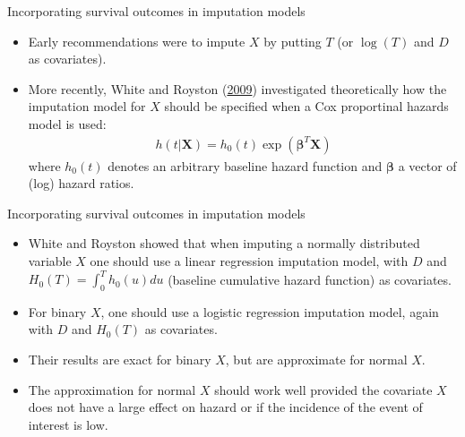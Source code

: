 \documentclass[ignorenonframetext,]{beamer}
\providecommand{\tightlist}{%
  \setlength{\itemsep}{0pt}\setlength{\parskip}{0pt}}
\begin{document}
\begin{frame}{Incorporating survival outcomes in imputation models}
\protect\hypertarget{incorporating-survival-outcomes-in-imputation-models}{}

\begin{itemize}
\tightlist
\item
  Early recommendations were to impute \(X\) by putting \(T\) (or
  \(\log(T)\) and \(D\) as covariates).
\item
  More recently, White and Royston
  (\protect\hyperlink{ref-White2009}{2009}) investigated theoretically
  how the imputation model for \(X\) should be specified when a Cox
  proportinal hazards model is used:\\
  \begin{align}
    h(t|\mathbf X) = h_{0}(t) \exp(\boldsymbol \beta^{T} \mathbf X)
  \end{align} where \(h_{0}(t)\) denotes an arbitrary baseline hazard
  function and \(\boldsymbol \beta\) a vector of (log) hazard ratios.
\end{itemize}

\end{frame}

\begin{frame}{Incorporating survival outcomes in imputation models}
\protect\hypertarget{incorporating-survival-outcomes-in-imputation-models-1}{}

\begin{itemize}
\tightlist
\item
  White and Royston showed that when imputing a normally distributed
  variable \(X\) one should use a linear regression imputation model,
  with \(D\) and \(H_{0}(T) = \int^{T}_{0} h_{0}(u) du\) (baseline
  cumulative hazard function) as covariates.
\item
  For binary \(X\), one should use a logistic regression imputation
  model, again with \(D\) and \(H_{0}(T)\) as covariates.
\item
  Their results are exact for binary \(X\), but are approximate for
  normal \(X\).
\item
  The approximation for normal \(X\) should work well provided the
  covariate \(X\) does not have a large effect on hazard or if the
  incidence of the event of interest is low.
\end{itemize}

\end{frame}
\end{document}
